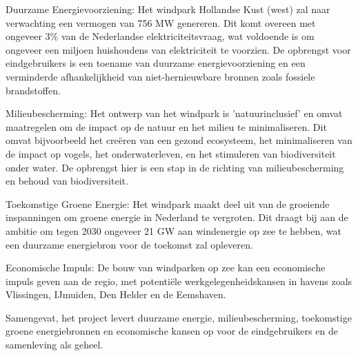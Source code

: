     Duurzame Energievoorziening: Het windpark Hollandse Kust (west) zal naar verwachting een vermogen van 756 MW genereren. Dit komt overeen met ongeveer 3\% van de Nederlandse elektriciteitsvraag, wat voldoende is om ongeveer een miljoen huishoudens van elektriciteit te voorzien. De opbrengst voor eindgebruikers is een toename van duurzame energievoorziening en een verminderde afhankelijkheid van niet-hernieuwbare bronnen zoals fossiele brandstoffen.

    Milieubescherming: Het ontwerp van het windpark is '\gls{natuurinclusief}' en omvat maatregelen om de impact op de natuur en het milieu te minimaliseren. Dit omvat bijvoorbeeld het creëren van een gezond ecosysteem, het minimaliseren van de impact op vogels, het onderwaterleven, en het stimuleren van biodiversiteit onder water. De opbrengst hier is een stap in de richting van milieubescherming en behoud van biodiversiteit.

    Toekomstige Groene Energie: Het windpark maakt deel uit van de groeiende inspanningen om groene energie in Nederland te vergroten. Dit draagt bij aan de ambitie om tegen 2030 ongeveer 21 GW aan windenergie op zee te hebben, wat een duurzame energiebron voor de toekomst zal opleveren.

    Economische Impuls: De bouw van windparken op zee kan een economische impuls geven aan de regio, met potentiële werkgelegenheidskansen in havens zoals Vlissingen, IJmuiden, Den Helder en de Eemshaven.

Samengevat, het project levert duurzame energie, milieubescherming, toekomstige groene energiebronnen en economische kansen op voor de eindgebruikers en de samenleving als geheel.\cite{Windenergiegebied}\cite{ShellEneco}\cite{Windopzee}





